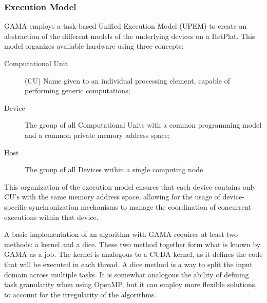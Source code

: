 \subsubsection{Execution Model}

GAMA employs a task-based Unified Execution Model (UPEM) to create an abstraction of the different models of the underlying devices on a HetPlat. This model organizes available hardware using three concepts:

\begin{description}
  \item[Computational Unit] (CU) Name given to an individual processing element, capable of performing generic computations;

  \item[Device] The group of all Computational Units with a common programming model and a common private memory address space;

  \item[Host] The group of all Devices within a single computing node.
\end{description}

This organization of the execution model ensures that each device contains only CU's with the same memory address space, allowing for the usage of device-specific synchronization mechanisms to manage the coordination of concurrent executions within that device.

A basic implementation of an algorithm with GAMA requires at least two methods: a kernel and a dice. These two method together form what is known by GAMA as a job. The kernel is analogous to a CUDA kernel, as it defines the code that will be executed in each thread. A dice method is a way to split the input domain across multiple tasks. It is somewhat analogous the ability of defining task granularity when using OpenMP, but it can employ more flexible solutions, to account for the irregularity of the algorithms.
